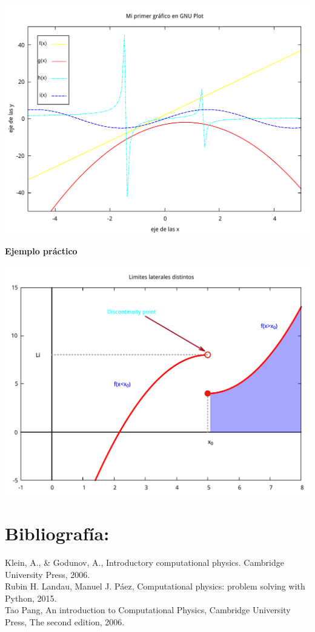 \documentclass[11.5pt,a4paper]{article}
\begin{document}
\includegraphics[scale=0.4]{ejemplo3.pdf} 

\textbf{Ejemplo práctico}

\includegraphics[scale=0.4]{ejemplo4.pdf} 


 

\section{Bibliografía:}

Klein, A., \& Godunov, A., Introductory computational physics. Cambridge University Press, 2006.\\

Rubin H. Landau, Manuel J. Páez, Computational physics: problem solving with Python, 2015.\\

Tao Pang, An introduction to Computational Physics, Cambridge University Press, The
second edition, 2006.
\end{document}
